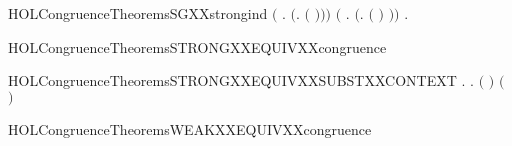 \begin{SaveVerbatim}{HOLCongruenceTheoremsSGXXstrongind}
       \ensuremath{(}\HOLSymConst{\HOLTokenForall{}} .   \HOLSymConst{\HOLTokenConj{}}   \HOLSymConst{\HOLTokenImp{}}  \ensuremath{(}\HOLTokenLambda{}.   \ensuremath{(} \ensuremath{)}\ensuremath{)}\ensuremath{)} \HOLSymConst{\HOLTokenConj{}}
       \ensuremath{(}\HOLSymConst{\HOLTokenForall{}} .   \HOLSymConst{\HOLTokenConj{}}   \HOLSymConst{\HOLTokenImp{}}  \ensuremath{(}\HOLTokenLambda{}.  \ensuremath{(} \ensuremath{)} \ensuremath{)}\ensuremath{)} \HOLSymConst{\HOLTokenImp{}}
       \HOLSymConst{\HOLTokenForall{}}.   \HOLSymConst{\HOLTokenImp{}}  
\end{SaveVerbatim}
\newcommand{\HOLCongruenceTheoremsSGXXstrongind}{\UseVerbatim{HOLCongruenceTheoremsSGXXstrongind}}
\begin{SaveVerbatim}{HOLCongruenceTheoremsSTRONGXXEQUIVXXcongruence}
\HOLTokenTurnstile{}  
\end{SaveVerbatim}
\newcommand{\HOLCongruenceTheoremsSTRONGXXEQUIVXXcongruence}{\UseVerbatim{HOLCongruenceTheoremsSTRONGXXEQUIVXXcongruence}}
\begin{SaveVerbatim}{HOLCongruenceTheoremsSTRONGXXEQUIVXXSUBSTXXCONTEXT}
\HOLTokenTurnstile{} \HOLSymConst{\HOLTokenForall{}} .
          \HOLSymConst{\HOLTokenImp{}}
       \HOLSymConst{\HOLTokenForall{}}.   \HOLSymConst{\HOLTokenImp{}}  \ensuremath{(} \ensuremath{)} \ensuremath{(} \ensuremath{)}
\end{SaveVerbatim}
\newcommand{\HOLCongruenceTheoremsSTRONGXXEQUIVXXSUBSTXXCONTEXT}{\UseVerbatim{HOLCongruenceTheoremsSTRONGXXEQUIVXXSUBSTXXCONTEXT}}
\begin{SaveVerbatim}{HOLCongruenceTheoremsWEAKXXEQUIVXXcongruence}
\HOLTokenTurnstile{}  
\end{SaveVerbatim}
\newcommand{\HOLCongruenceTheoremsWEAKXXEQUIVXXcongruence}{\UseVerbatim{HOLCongruenceTheoremsWEAKXXEQUIVXXcongruence}}
